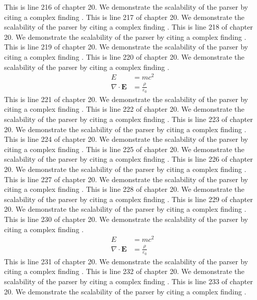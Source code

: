 This is line 216 of chapter 20. We demonstrate the scalability of the parser by citing a complex finding \cite{ref20_216}.
This is line 217 of chapter 20. We demonstrate the scalability of the parser by citing a complex finding \cite{ref20_217}.
This is line 218 of chapter 20. We demonstrate the scalability of the parser by citing a complex finding \cite{ref20_218}.
This is line 219 of chapter 20. We demonstrate the scalability of the parser by citing a complex finding \cite{ref20_219}.
This is line 220 of chapter 20. We demonstrate the scalability of the parser by citing a complex finding \cite{ref20_220}.
\begin{align*}
  E &= mc^2 \\
  \nabla \cdot \mathbf{E} &= \frac{\rho}{\varepsilon_0}
\end{align*}
This is line 221 of chapter 20. We demonstrate the scalability of the parser by citing a complex finding \cite{ref20_221}.
This is line 222 of chapter 20. We demonstrate the scalability of the parser by citing a complex finding \cite{ref20_222}.
This is line 223 of chapter 20. We demonstrate the scalability of the parser by citing a complex finding \cite{ref20_223}.
This is line 224 of chapter 20. We demonstrate the scalability of the parser by citing a complex finding \cite{ref20_224}.
This is line 225 of chapter 20. We demonstrate the scalability of the parser by citing a complex finding \cite{ref20_225}.
This is line 226 of chapter 20. We demonstrate the scalability of the parser by citing a complex finding \cite{ref20_226}.
This is line 227 of chapter 20. We demonstrate the scalability of the parser by citing a complex finding \cite{ref20_227}.
This is line 228 of chapter 20. We demonstrate the scalability of the parser by citing a complex finding \cite{ref20_228}.
This is line 229 of chapter 20. We demonstrate the scalability of the parser by citing a complex finding \cite{ref20_229}.
This is line 230 of chapter 20. We demonstrate the scalability of the parser by citing a complex finding \cite{ref20_230}.
\begin{align*}
  E &= mc^2 \\
  \nabla \cdot \mathbf{E} &= \frac{\rho}{\varepsilon_0}
\end{align*}
This is line 231 of chapter 20. We demonstrate the scalability of the parser by citing a complex finding \cite{ref20_231}.
This is line 232 of chapter 20. We demonstrate the scalability of the parser by citing a complex finding \cite{ref20_232}.
This is line 233 of chapter 20. We demonstrate the scalability of the parser by citing a complex finding \cite{ref20_233}.
